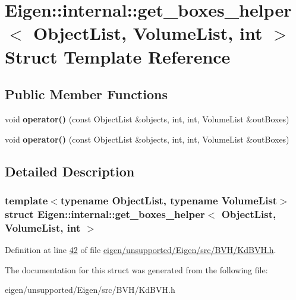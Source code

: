 \hypertarget{struct_eigen_1_1internal_1_1get__boxes__helper_3_01_object_list_00_01_volume_list_00_01int_01_4}{}\section{Eigen\+:\+:internal\+:\+:get\+\_\+boxes\+\_\+helper$<$ Object\+List, Volume\+List, int $>$ Struct Template Reference}
\label{struct_eigen_1_1internal_1_1get__boxes__helper_3_01_object_list_00_01_volume_list_00_01int_01_4}
\subsection*{Public Member Functions}
\begin{DoxyCompactItemize}
\item 
\mbox{\label{struct_eigen_1_1internal_1_1get__boxes__helper_3_01_object_list_00_01_volume_list_00_01int_01_4_aaae153e0656dc5391031f12eeda957f7}} 
void {\bfseries operator()} (const Object\+List \&objects, int, int, Volume\+List \&out\+Boxes)
\item 
\mbox{\label{struct_eigen_1_1internal_1_1get__boxes__helper_3_01_object_list_00_01_volume_list_00_01int_01_4_aaae153e0656dc5391031f12eeda957f7}} 
void {\bfseries operator()} (const Object\+List \&objects, int, int, Volume\+List \&out\+Boxes)
\end{DoxyCompactItemize}


\subsection{Detailed Description}
\subsubsection*{template$<$typename Object\+List, typename Volume\+List$>$\newline
struct Eigen\+::internal\+::get\+\_\+boxes\+\_\+helper$<$ Object\+List, Volume\+List, int $>$}



Definition at line \hyperlink{eigen_2unsupported_2_eigen_2src_2_b_v_h_2_kd_b_v_h_8h_source_l00042}{42} of file \hyperlink{eigen_2unsupported_2_eigen_2src_2_b_v_h_2_kd_b_v_h_8h_source}{eigen/unsupported/\+Eigen/src/\+B\+V\+H/\+Kd\+B\+V\+H.\+h}.



The documentation for this struct was generated from the following file\+:\begin{DoxyCompactItemize}
\item 
eigen/unsupported/\+Eigen/src/\+B\+V\+H/\+Kd\+B\+V\+H.\+h\end{DoxyCompactItemize}

